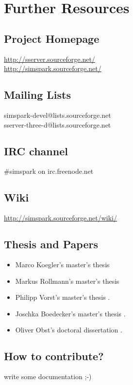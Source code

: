 \chapter{Further Resources}
\label{cha:resources}


\section{Project Homepage}

\url{http://sserver.sourceforge.net/}\\
\url{http://simspark.sourceforge.net/}

\section{Mailing Lists}

simspark-devel@lists.sourceforge.net\\
sserver-three-d@lists.sourceforge.net

\section{IRC channel}

\#simspark on irc.freenode.net

\section{Wiki}

\url{http://simspark.sourceforge.net/wiki/}

\section{Thesis and Papers}

\begin{itemize}
\item Marco Koegler's master's thesis \cite{Koegler03}
\item Markus Rollmann's master's thesis \cite{Rollmann04}
\item Philipp Vorst's master's thesis \cite{Vorst06}.
\item Joschka Boedecker's master's thesis \cite{Boedecker06}.
\item Oliver Obst's doctoral dissertation \cite{Obst07}.
\end{itemize}

\section{How to contribute?}

write some documentation ;-)

